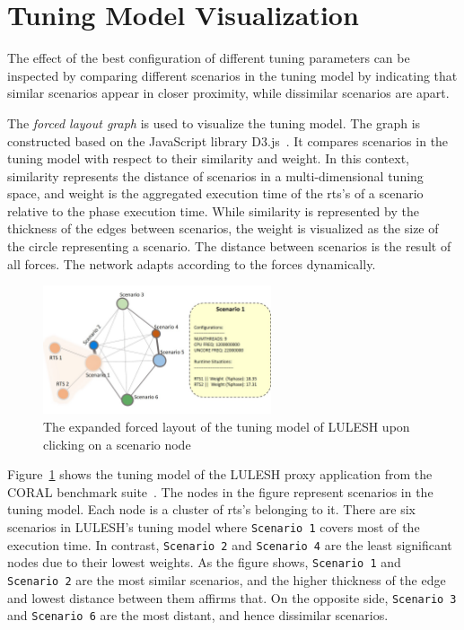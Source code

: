 \section{Tuning Model Visualization} \label{sec:tm-visualization}
The effect of the best configuration of different tuning parameters can be inspected by comparing different scenarios in the tuning model by indicating that similar scenarios appear in closer proximity, while dissimilar scenarios are apart.

The \textit{forced layout graph} is used to visualize the tuning model. The graph is constructed based on the JavaScript library D3.js~\cite{bostock2011d3}. It compares scenarios in the tuning model with respect to their similarity and weight. In this context, similarity represents the distance of scenarios in a multi-dimensional tuning space, and weight is the aggregated execution time of the rts's of a scenario relative to the phase execution time. While similarity is represented by the thickness of the edges between scenarios, the weight is visualized as the size of the circle representing a scenario. The distance between scenarios is the result of all forces. The network adapts according to the forces dynamically. 

\begin{figure}
	\begin{mdframed}
	\centering
		\includegraphics[width=0.60\textwidth]{figures/luleshTM_expand.jpg}
	\end{mdframed}
	\caption{\label{fig:forced-layout-expand}The expanded forced layout of the tuning model of LULESH upon clicking on a scenario node }
\end{figure}

Figure~\ref{fig:forced-layout-expand} shows the tuning model of the LULESH proxy application from the CORAL benchmark suite~\cite{coral_benchmarks}. The nodes in the figure represent scenarios in the tuning model. Each node is a cluster of rts's belonging to it. There are six scenarios in LULESH's tuning model where \texttt{Scenario~1} covers most of the execution time. In contrast, \texttt{Scenario~2} and \texttt{Scenario~4} are the least significant nodes due to their lowest weights. As the figure shows, \texttt{Scenario~1} and \texttt{Scenario~2} are the most similar scenarios, and the higher thickness of the edge and lowest distance between them affirms that. On the opposite side, \texttt{Scenario~3} and \texttt{Scenario~6} are the most distant, and hence dissimilar scenarios.

